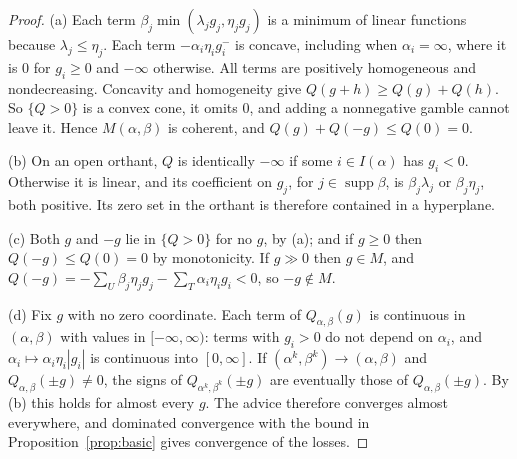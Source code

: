 \documentclass[11pt]{article}
\theoremstyle{remark}\newtheorem{remark}[theorem]{Remark}
\newcommand{\supp}{\operatorname{supp}}
\begin{document}
\begin{proof}
(a) Each term $\beta_j\min(\lambda_jg_j,\eta_jg_j)$ is a minimum of linear
functions because $\lambda_j\le\eta_j$. Each term $-\alpha_i\eta_ig_i^-$ is
concave, including when $\alpha_i=\infty$, where it is $0$ for $g_i\ge0$ and
$-\infty$ otherwise. All terms are positively homogeneous and
nondecreasing. Concavity and homogeneity give
$Q(g+h)\ge Q(g)+Q(h)$. So $\{Q>0\}$ is a convex cone, it omits $0$, and
adding a nonnegative gamble cannot leave it. Hence $M(\alpha,\beta)$ is
coherent, and $Q(g)+Q(-g)\le Q(0)=0$.

(b) On an open orthant, $Q$ is identically $-\infty$ if some $i\in
I(\alpha)$ has $g_i<0$. Otherwise it is linear, and its coefficient on
$g_j$, for $j\in\supp\beta$, is $\beta_j\lambda_j$ or $\beta_j\eta_j$, both
positive. Its zero set in the orthant is therefore contained in a
hyperplane.

(c) Both $g$ and $-g$ lie in $\{Q>0\}$ for no $g$, by (a); and if $g\ge0$ then $Q(-g)\le Q(0)=0$ by monotonicity. If $g\gg0$ then $g\in M$, and
$Q(-g)=-\sum_U\beta_j\eta_jg_j-\sum_T\alpha_i\eta_ig_i<0$, so $-g\notin M$.

(d) Fix $g$ with no zero coordinate. Each term of $Q_{\alpha,\beta}(g)$ is
continuous in $(\alpha,\beta)$ with values in $[-\infty,\infty)$: terms with
$g_i>0$ do not depend on $\alpha_i$, and $\alpha_i\mapsto\alpha_i\eta_i|g_i|$
is continuous into $[0,\infty]$. If $(\alpha^k,\beta^k)\to(\alpha,\beta)$
and $Q_{\alpha,\beta}(\pm g)\ne0$, the signs of $Q_{\alpha^k,\beta^k}(\pm g)$
are eventually those of $Q_{\alpha,\beta}(\pm g)$. By (b) this holds for
almost every $g$. The advice therefore converges almost everywhere, and
dominated convergence with the bound in Proposition~\ref{prop:basic}
gives convergence of the losses.
\end{proof}
\end{document}
